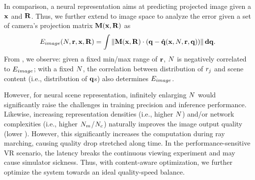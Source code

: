 In comparison, a neural representation aims at predicting projected image given a $\mathbf{x}$ and $\mathbf{R}$. Thus, we further extend  to image space to analyze the error given a set of camera's projection matrix  $\mathbf{M}(\mathbf{x},\mathbf{R})$ as
\begin{align}
E_{image}(N, \mathbf{r}, \mathbf{x}, \mathbf{R})  = \int \left\lVert\mathbf{M}(\mathbf{x},\mathbf{R})\cdot\left(\mathbf{q}-
\hat{\mathbf{q}}(\mathbf{x},N, \mathbf{r},\mathbf{q})\right)\right\rVert\mathbf{d}\mathbf{q}.
\label{eq:imageError}
\end{align}
From , we observe:
given a fixed min/max range of $\mathbf{r}$, $N$ is negatively correlated to $E_{image}$;
with a fixed $N$, the correlation between distribution of $r_j$ and scene content (i.e., distribution of $\mathbf{q}$s) also determines $E_{image}$.

However, for neural scene representation, infinitely enlarging $N$ would significantly raise the challenges in training precision and inference performance.
Likewise, increasing representation densities (i.e., higher $N$) and/or network complexities (i.e., higher $N_{m}$/$N_{c}$) naturally improves the image output quality (lower ). However, this significantly increases the computation during ray marching, causing quality drop stretched along time. In the performance-sensitive VR scenario, the latency breaks the continuous viewing experiment and may cause simulator sickness. Thus, with content-aware optimization, we further optimize the system towards an ideal quality-speed balance.%

